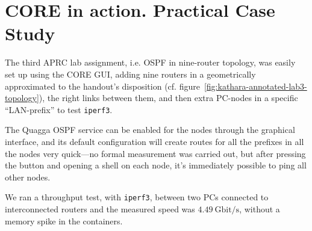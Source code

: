 \section{CORE in action. Practical Case Study}
\label{sec:corepracticalcasestudy}

The third APRC lab assignment, i.e. OSPF in nine-router topology, was easily set up using the CORE GUI, adding nine routers in a geometrically approximated to the handout's disposition (cf. figure~\ref{fig:kathara-annotated-lab3-topology}), the right links between them, and then extra PC-nodes in a specific ``LAN-prefix'' to test \texttt{iperf3}.



The Quagga OSPF service can be enabled for the nodes through the graphical interface, and its default configuration will create routes for all the prefixes in all the nodes very quick---no formal measurement was carried out, but after pressing the button and opening a shell on each node, it's immediately possible to ping all other nodes.

We ran a throughput test, with \texttt{iperf3}, between two PCs connected to interconnected routers and the measured speed was $4.49~\mbox{Gbit/s}$, without a memory spike in the containers.


